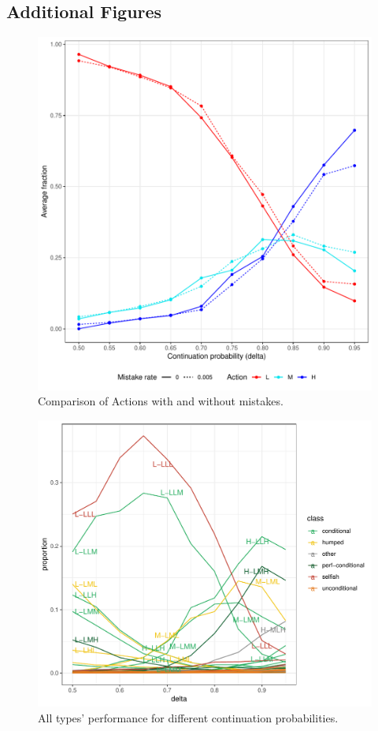 \documentclass[12pt]{article}
\begin{document}
\subsection*{Additional Figures}
\label{sec:evo-additional}
\begin{figure}[H]
\begin{center}
    \includegraphics[width=0.8\linewidth]{img/actions_over_delta_with_mistakes.pdf}
    \caption{Comparison of Actions with and without mistakes.}
	\label{fig:mistake-comparision}
\end{center}
\end{figure}


\begin{figure}[H]
\begin{center}
    \includegraphics[width=0.8\linewidth]{img/all_types_t05.pdf}
    \caption{All types' performance for different continuation probabilities.}
	\label{fig:alltypes}
\end{center}
\end{figure}


  
  
\end{document}
